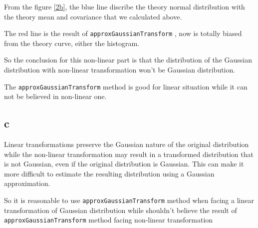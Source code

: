 From the figure \ref{2b}, the blue line discribe the theory normal distribution with the theory mean and covariance that we calculated above.

The red line is the result of \texttt{approxGaussianTransform} , now is totally biased from the theory curve, either the histogram.

So the conclusion for this non-linear part is that the distribution of the Gaussian distribution with non-linear transformation won't be Gaussian distribution.

The \texttt{approxGaussianTransform} method is good for linear situation while it can not be believed in non-linear one.

\subsection{c}

Linear transformations preserve the Gaussian nature of the original distribution while the non-linear transformation may result in a transformed distribution that is not Gaussian, even if the original distribution is Gaussian. This can make it more difficult to estimate the resulting distribution using a Gaussian approximation.

So it is reasonable to use \texttt{approxGaussianTransform} method when facing a linear transformation of Gaussian distribution while shouldn't believe the result of \texttt{approxGaussianTransform} method facing non-linear transformation
